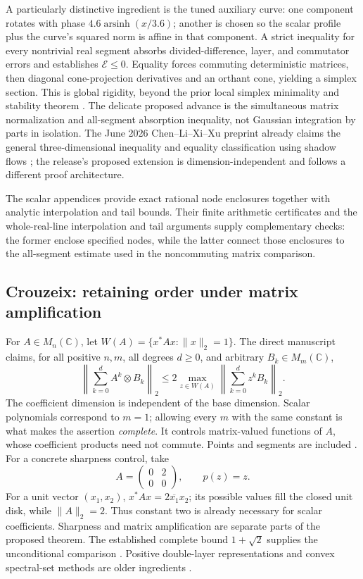 A particularly distinctive ingredient is the tuned auxiliary curve:
one component rotates with phase \(4.6\operatorname{arsinh}(x/3.6)\);
another is chosen so the scalar profile plus the curve's squared norm
is affine in that component. A strict inequality for every nontrivial real segment
absorbs divided-difference, layer, and commutator errors and establishes
\(\mathcal E\le0\). Equality forces commuting deterministic matrices,
then diagonal cone-projection derivatives and an orthant cone,
yielding a simplex section. This is global rigidity, beyond the prior
local simplex minimality and stability theorem
\cite{GOKimReisner2011}. The delicate proposed advance is the
simultaneous matrix normalization and all-segment absorption inequality,
not Gaussian integration by parts in isolation.
The June 2026 Chen--Li--Xi--Xu preprint already claims the general
three-dimensional inequality and equality classification using shadow
flows \cite{GOChenLiXiXu2026}; the release's proposed extension is
dimension-independent and follows a different proof architecture.

The scalar appendices provide exact rational node enclosures together
with analytic interpolation and tail bounds. Their finite
arithmetic certificates and the whole-real-line interpolation and tail
arguments supply complementary checks: the former enclose specified
nodes, while the latter connect those enclosures to the all-segment
estimate used in the noncommuting matrix comparison.

\subsection{Crouzeix: retaining order under matrix amplification}
\label{subsec:go-crouzeix}

For \(A\in M_n(\mathbb C)\), let
\(W(A)=\{x^*Ax:\|x\|_2=1\}\).
The direct manuscript claims, for all positive \(n,m\), all degrees
\(d\ge0\), and arbitrary \(B_k\in M_m(\mathbb C)\),
\[
 \left\|\sum_{k=0}^d A^k\otimes B_k\right\|_2
 \le2\max_{z\in W(A)}
       \left\|\sum_{k=0}^d z^kB_k\right\|_2 .
\]
The coefficient dimension is independent of the base dimension.
Scalar polynomials correspond to \(m=1\); allowing every \(m\) with
the same constant is what makes the assertion \emph{complete}. It
controls matrix-valued functions of \(A\), whose coefficient products
need not commute. Points and segments are included \cite{GOOpenAIDirectCrouzeix2026}.
For a concrete sharpness control, take
\[
 A=\begin{pmatrix}0&2\\0&0\end{pmatrix},\qquad p(z)=z.
\]
For a unit vector \((x_1,x_2)\),
\(x^*Ax=2\overline{x_1}x_2\); its possible values fill the closed
unit disk, while \(\|A\|_2=2\). Thus constant two is already necessary
for scalar coefficients. Sharpness and matrix amplification are
separate parts of the proposed theorem. The established complete bound
\(1+\sqrt2\) supplies the unconditional comparison
\cite{GOCrouzeixPalencia2017}. Positive double-layer representations
and convex spectral-set methods are older ingredients
\cite{GODelyonDelyon1999,GOBadeaCrouzeixDelyon2006}.

